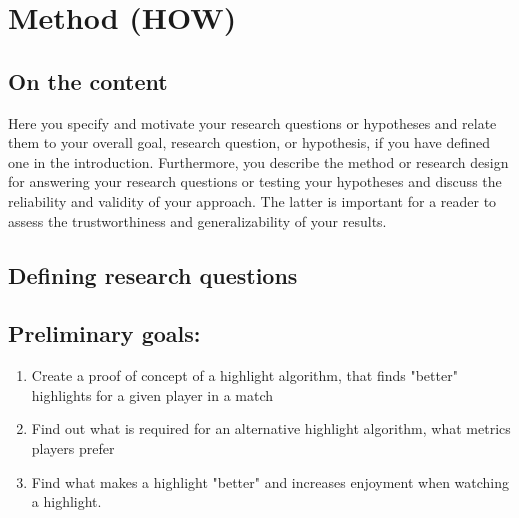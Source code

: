 
\chapter{Method (HOW)}
\label{chp:method}
\section{On the content}
Here you specify and motivate your research questions or hypotheses and relate them to your overall goal, research question, or hypothesis, if you have defined one in the introduction. Furthermore, you describe the method or research design for answering your research questions or testing your hypotheses and discuss the reliability and validity of your approach. The latter is important for a reader to assess the trustworthiness and generalizability of your results.  


\section{Defining research questions}

\section{Preliminary goals:}
\normalsize
\begin{enumerate}[label=PG\arabic*., leftmargin=*]
    \item Create a proof of concept of a highlight algorithm, that finds "better" highlights for a given player in a match
    \item Find out what is required for an alternative highlight algorithm, what metrics players prefer
    \item Find what makes a highlight "better" and increases enjoyment when watching a highlight.
\end{enumerate}


